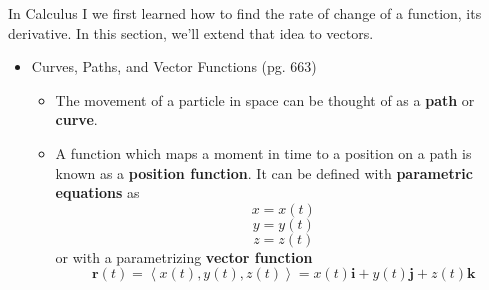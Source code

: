 \documentclass[12pt]{article}
\theoremstyle{plain}
\theoremstyle{definition}
\theoremstyle{remark}
\newcommand{\vect}[1]{\mathbf{#1}}
\newcommand{\veci}{\mathbf{i}}
\newcommand{\vecj}{\mathbf{j}}
\newcommand{\veck}{\mathbf{k}}
\begin{document}
	In Calculus I we first learned how to find the rate of change of a function, its derivative. In this section, we'll extend that idea to vectors.
	
	\begin{itemize}
	\item Curves, Paths, and Vector Functions (pg. 663)
		\begin{itemize}
		\item The movement of a particle in space can be thought of as a \textbf{path} or \textbf{curve}.
		
		\item A function which maps a moment in time to a position on a path is known as a \textbf{position function}. It can be defined with \textbf{parametric equations} as \[x=x(t)\] \[y=y(t)\] \[z=z(t)\] or with a parametrizing \textbf{vector function} \[\vect{r}(t) = \left<x(t),y(t),z(t)\right> = x(t)\veci + y(t)\vecj + z(t)\veck\]
		

\end{itemize}
\end{itemize}
\end{document}
